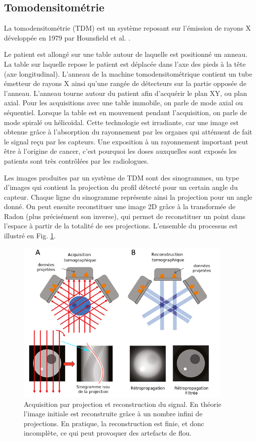 \subsection{Tomodensitométrie}
\label{sec:contexte:images:CT}
La tomodensitométrie (TDM) est un système reposant sur l'émission de rayons X développée en 1979 par Hounsfield et al. \cite{Hounsfield1995_CT_machine}.

Le patient est allongé sur une table autour de laquelle est positionné un anneau. La table sur laquelle repose le patient est déplacée dans l'axe des pieds à la tête (axe longitudinal). L'anneau de la machine tomodensitométrique contient un tube émetteur de rayons X ainsi qu'une rangée de détecteurs sur la partie opposée de l'anneau. L'anneau tourne autour du patient afin d'acquérir le plan XY, ou plan axial. Pour les acquisitions avec une table immobile, on parle de mode axial ou séquentiel. Lorsque la table est en mouvement pendant l'acquisition, on parle de mode spiralé ou hélicoïdal. Cette technologie est irradiante, car une image est obtenue grâce à l'absorption du rayonnement par les organes qui atténuent de fait le signal reçu par les capteurs.  Une exposition à un rayonnement important peut être à l'origine de cancer, c'est pourquoi les doses auxquelles sont exposés les patients sont très contrôlées par les radiologues.

Les images produites par un système de TDM sont des sinogrammes, un type d'images qui contient la projection du profil détecté pour un certain angle du capteur. Chaque ligne du sinogramme représente ainsi la projection pour un angle donné. On peut ensuite reconstituer une image 2D grâce à la transformée de Radon (plus précisément son inverse), qui permet de reconstituer un point dans l'espace à partir de la totalité de ses projections. L'ensemble du processus est illustré en Fig. \ref{fig:tomography}.
\begin{figure}
    \centering
    \includegraphics[height=8cm]{Images/Tomo_projection_2.png}
    \caption{Acquisition par projection et reconstruction du signal. En théorie l'image initiale est reconstruite grâce à un nombre infini de projections. En pratique, la reconstruction est finie, et donc incomplète, ce qui peut provoquer des artefacts de flou.}
    \label{fig:tomography}
\end{figure}

